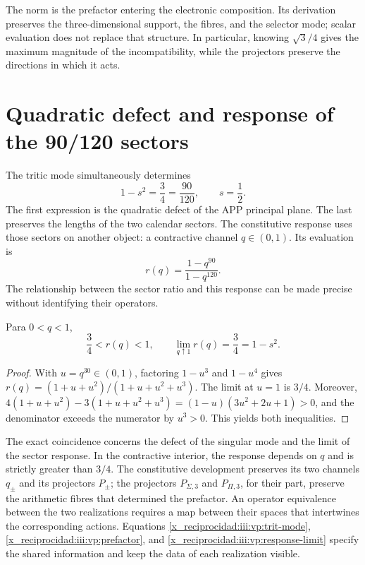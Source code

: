 The norm is the prefactor entering the electronic composition.
Its derivation preserves the three-dimensional support, the fibres, and the
selector mode; scalar evaluation does not replace that structure. In
particular, knowing $\sqrt3/4$ gives the maximum magnitude of
the incompatibility, while the projectors preserve the directions
in which it acts.

\clearpage
\section{Quadratic defect and response of the 90/120 sectors}

The tritic mode simultaneously determines
\begin{equation}
 1-s^2=\frac34=\frac{90}{120},\qquad s=\frac12.
 \label{x_reciprocidad:iii:vp:defect-ratio}
\end{equation}
The first expression is the quadratic defect of the APP principal plane.
The last preserves the lengths of the two calendar sectors.
The constitutive response uses those sectors on another object: a
contractive channel $q\in(0,1)$. Its evaluation is
\[
 r(q)=\frac{1-q^{90}}{1-q^{120}}.
\]
The relationship between the sector ratio and this response can be
made precise without identifying their operators.

\begin{proposition}
Para $0<q<1$,
\begin{equation}
 \frac34<r(q)<1,\qquad
 \lim_{q\uparrow1}r(q)=\frac34=1-s^2.
 \label{x_reciprocidad:iii:vp:response-limit}
\end{equation}
\end{proposition}
\begin{proof}
With $u=q^{30}\in(0,1)$, factoring $1-u^3$ and
$1-u^4$ gives
$r(q)=(1+u+u^2)/(1+u+u^2+u^3)$. The limit at $u=1$ is
$3/4$. Moreover,
$4(1+u+u^2)-3(1+u+u^2+u^3)
=(1-u)(3u^2+2u+1)>0$, and the denominator exceeds the numerator
by $u^3>0$. This yields both inequalities.
\end{proof}

The exact coincidence concerns the defect of the singular mode and the limit
of the sector response. In the contractive interior, the response
depends on $q$ and is strictly greater than $3/4$. The constitutive
development preserves its two channels $q_\pm$ and its projectors
$P_\pm$; the projectors $P_{\Sigma,3}$ and $P_{\Pi,3}$, for their
part, preserve the arithmetic fibres that determined the prefactor.
An operator equivalence between the two realizations requires a map
between their spaces that intertwines the corresponding actions.
Equations \eqref{x_reciprocidad:iii:vp:trit-mode}, \eqref{x_reciprocidad:iii:vp:prefactor}, and
\eqref{x_reciprocidad:iii:vp:response-limit} specify the shared information and
keep the data of each realization visible.

